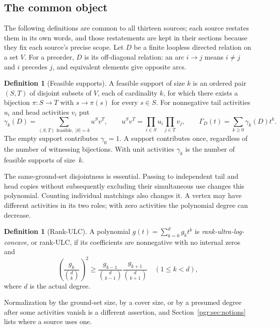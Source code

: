 \documentclass[11pt]{article}
\numberwithin{equation}{section}
\theoremstyle{definition}\newtheorem{definition}[theorem]{Definition}\newtheorem{remark}[theorem]{Remark}
\newcommand{\Ga}{\Gamma}                   %
\begin{document}
\subsection{The common object}\label{pgr:sec:object}
The following definitions are common to all thirteen sources; each source %
restates them in its own words, and those restatements are kept in their
sections because they fix each source's precise scope. Let $D$ be a finite
loopless directed relation on a set $V$. For a preorder, $D$ is its
off-diagonal relation: an arc $i\to j$ means $i\ne j$ and $i$ precedes $j$,
and equivalent elements give opposite arcs.

\begin{definition}[Feasible supports]\label{pgr:def:support}
A feasible support of size $k$ is an ordered pair $(S,T)$ of disjoint
subsets of $V$, each of cardinality $k$, for which there exists a bijection
$\pi:S\to T$ with $s\to\pi(s)$ for every $s\in S$. For nonnegative tail
activities $u_i$ and head activities $v_i$ put
\[
 \gamma_k(D)=\sum_{(S,T)\text{ feasible},\ |S|=k}u^Sv^T,\qquad
 u^Sv^T=\prod_{i\in S}u_i\prod_{j\in T}v_j,\qquad
 \Ga_D(t)=\sum_{k\ge0}\gamma_k(D)t^k .
\]
The empty support contributes $\gamma_0=1$. A support contributes once,
regardless of the number of witnessing bijections. With unit activities
$\gamma_k$ is the number of feasible supports of size~$k$.
\end{definition}
The same-ground-set disjointness is essential. Passing to independent tail
and head copies without subsequently excluding their simultaneous use
changes this polynomial. Counting individual matchings also changes it.
A vertex may have different activities in its two roles; with zero
activities the polynomial degree can decrease.

\begin{definition}[Rank-ULC]\label{pgr:def:ulc}
A polynomial $g(t)=\sum_{k=0}^dg_kt^k$ is \emph{rank-ultra-log-concave}, or
rank-ULC, if its coefficients are nonnegative with no internal zeros and
\[
 \left(\frac{g_k}{\binom dk}\right)^2\ge
 \frac{g_{k-1}}{\binom d{k-1}}\frac{g_{k+1}}{\binom d{k+1}}
 \quad(1\le k<d),
\]
where $d$ is the actual degree.
\end{definition}
Normalization by the ground-set size, by a cover size, or by a presumed
degree after some activities vanish is a different assertion, and
Section~\ref{pgr:sec:notions} lists where a source uses one.
\end{document}
